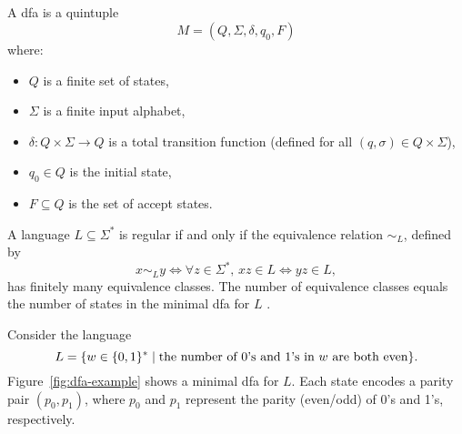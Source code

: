 \subsection{}
\label{subsec:dfa}

\begin{definition}
A \gls{dfa} is a quintuple 
\[
M = (Q, \Sigma, \delta, q_0, F)
\]
where:
\begin{itemize}
    \item \( Q \) is a finite set of states,
    \item \( \Sigma \) is a finite input alphabet,
    \item \( \delta: Q \times \Sigma \rightarrow Q \) is a total transition function (defined for all \( (q, \sigma) \in Q \times \Sigma \)),
    \item \( q_0 \in Q \) is the initial state,
    \item \( F \subseteq Q \) is the set of accept states.
\end{itemize}
\end{definition}

\begin{theorem}
    \label{thm:myhill-nerode}
    A language \( L \subseteq \Sigma^* \) is regular if and only if the equivalence relation \( \sim_L \), defined by
    \[
    x \sim_L y \iff \forall z \in \Sigma^*,\, xz \in L \Longleftrightarrow yz \in L,
    \]
    has finitely many equivalence classes. The number of equivalence classes equals the number of states in the minimal \gls{dfa} for \( L \) \cite{sipser2013introduction, myhill1957finite, nerode1958linear}.
\end{theorem}

\begin{example}
Consider the language 
\[
L = \{ w \in \{0,1\}^* \mid \text{the number of 0's and 1's in \( w \) are both even} \}.
\]
Figure~\ref{fig:dfa-example} shows a minimal \gls{dfa} for \( L \). Each state encodes a parity pair \((p_0, p_1)\), where \( p_0 \) and \( p_1 \) represent the parity (even/odd) of 0's and 1's, respectively.
\end{example}

